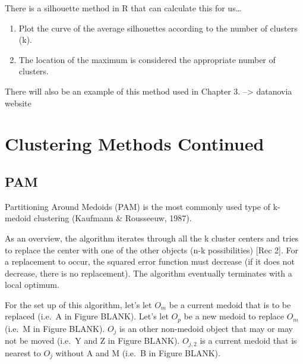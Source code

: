\documentclass[12pt,twoside]{amherstthesis}
\providecommand{\tightlist}{%
  \setlength{\itemsep}{0pt}\setlength{\parskip}{0pt}}
\begin{document}
  There is a silhouette method in R that can calculate this for us\ldots{}
  
  \begin{enumerate}
  \def\labelenumi{\arabic{enumi}.}
  \setcounter{enumi}{2}
  \tightlist
  \item
    Plot the curve of the average silhouettes according to the number of
    clusters (k).
  \item
    The location of the maximum is considered the appropriate number of
    clusters.
  \end{enumerate}
  
  There will also be an example of this method used in Chapter 3.
  --\textgreater{} datanovia website
  
  \chapter{Clustering Methods Continued}\label{typeset-equ}
  
  \section{PAM}\label{pam}
  
  Partitioning Around Medoids (PAM) is the most commonly used type of
  k-medoid clustering (Kaufmann \& Rousseeuw, 1987).
  
  As an overview, the algorithm iterates through all the k cluster centers
  and tries to replace the center with one of the other objects (n-k
  possibilities) {[}Rec 2{]}. For a replacement to occur, the squared
  error function must decrease (if it does not decrease, there is no
  replacement). The algorithm eventually terminates with a local optimum.
  
  For the set up of this algorithm, let's let \(O_m\) be a current medoid
  that is to be replaced (i.e.~A in Figure BLANK). Let's let \(O_p\) be a
  new medoid to replace \(O_m\) (i.e.~M in Figure BLANK). \(O_j\) is an
  other non-medoid object that may or may not be moved (i.e.~Y and Z in
  Figure BLANK). \(O_{j,2}\) is a current medoid that is nearest to
  \(O_j\) without A and M (i.e.~B in Figure BLANK).
  
  \begin{Shaded}
  \begin{Highlighting}[]
  \NormalTok{(} \NormalTok{, }
         \NormalTok{, }
         \NormalTok{, } \NormalTok{, } \NormalTok{)}
  \end{Highlighting}
  \end{Shaded}
  
\end{document}
